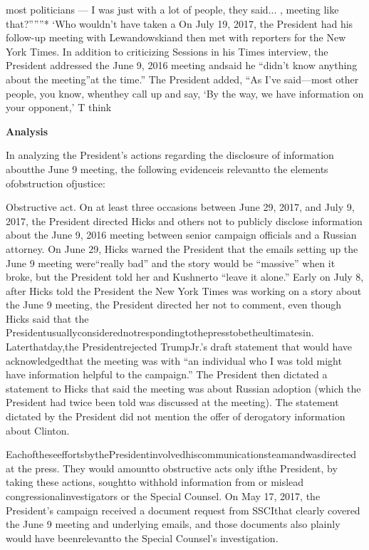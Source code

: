 most politicians — I was just with a lot of people, they said... , meeting like that?”””*
‘Who wouldn’t have taken a
On July 19, 2017, the President had his follow-up meeting with Lewandowskiand then met with reporters for the New York Times. In addition to criticizing Sessions in his Times interview, the President addressed the June 9, 2016 meeting andsaid he “didn’t know anything about the meeting”at the time.” The President added, “As I’ve said—most other people, you know, whenthey call up and say, ‘By the way, we have information on your opponent,’ T think

\begin{center}
\textbf{Analysis}
\end{center}

In analyzing the President’s actions regarding the disclosure of information aboutthe June 9 meeting, the following evidenceis relevantto the elements ofobstruction ofjustice:

Obstructive act. On at least three occasions between June 29, 2017, and July 9, 2017, the President directed Hicks and others not to publicly disclose information about the June 9, 2016 meeting between senior campaign officials and a Russian attorney. On June 29, Hicks warned the President that the emails setting up the June 9 meeting were“really bad” and the story would be “massive” when it broke, but the President told her and Kushnerto “leave it alone.” Early on July 8, after Hicks told the President the New York Times was working on a story about the June 9 meeting, the President directed her not to comment, even though Hicks said that the Presidentusuallyconsiderednotrespondingtothepresstobetheultimatesin. Laterthatday,the Presidentrejected TrumpJr.’s draft statement that would have acknowledgedthat the meeting was with “an individual who I was told might have information helpful to the campaign.” The President then dictated a statement to Hicks that said the meeting was about Russian adoption (which the President had twice been told was discussed at the meeting). The statement dictated by the President did not mention the offer of derogatory information about Clinton.

EachoftheseeffortsbythePresidentinvolvedhiscommunicationsteamandwasdirected at the press. They would amountto obstructive acts only ifthe President, by taking these actions, soughtto withhold information from or mislead congressionalinvestigators or the Special Counsel. On May 17, 2017, the President’s campaign received a document request from SSCIthat clearly covered the June 9 meeting and underlying emails, and those documents also plainly would have beenrelevantto the Special Counsel’s investigation.


